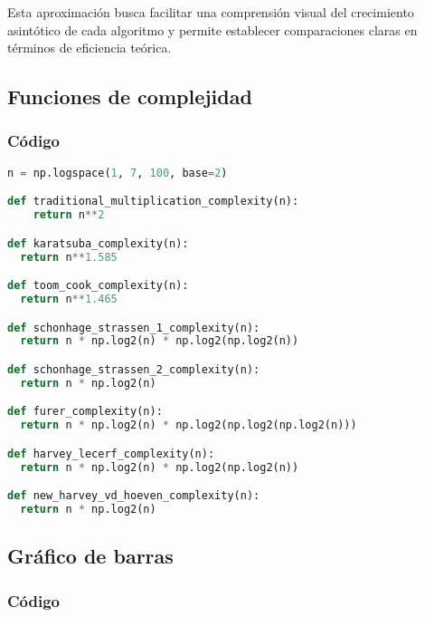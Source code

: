 Esta aproximación busca facilitar una comprensión visual del crecimiento asintótico de cada algoritmo y permite establecer comparaciones claras en términos de eficiencia teórica.

\subsection{Funciones de complejidad}

\subsubsection{Código}
\begin{lstlisting}[language=Python, caption={Codigo funciones de complejidad por algoritmo en Python}, label=list:python_code_ex]
n = np.logspace(1, 7, 100, base=2)

def traditional_multiplication_complexity(n):
    return n**2

def karatsuba_complexity(n):
  return n**1.585

def toom_cook_complexity(n):
  return n**1.465

def schonhage_strassen_1_complexity(n):
  return n * np.log2(n) * np.log2(np.log2(n))

def schonhage_strassen_2_complexity(n):
  return n * np.log2(n)

def furer_complexity(n):
  return n * np.log2(n) * np.log2(np.log2(np.log2(n)))

def harvey_lecerf_complexity(n):
  return n * np.log2(n) * np.log2(np.log2(n))

def new_harvey_vd_hoeven_complexity(n):
  return n * np.log2(n)
\end{lstlisting}

\subsection{Gráfico de barras}

\subsubsection{Código}

